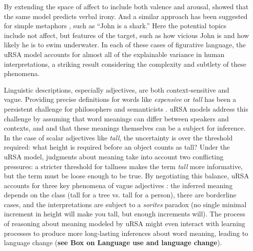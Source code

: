 \documentclass[]{elsarticle}
\begin{document}
By extending
the space of affect to include both valence and arousal, \citet{kao2015} showed that the same model predicts verbal irony. And a similar approach has been suggested for simple
metaphors \citep{kao2014b}, such as ``John is a shark.''
Here the potential topics include not affect, but features of the
target, such as how vicious John is and how likely he is to swim
underwater. In each of these cases of figurative language, the uRSA model accounts for almost all of the explainable variance in
human interpretations, a striking result considering the complexity and subtlety of these phenomena.

Linguistic descriptions, especially adjectives, are both context-sensitive and vague. Providing precise definitions for words like \emph{expensive} or \emph{tall} has been a persistent challenge for philosophers and semanticists \citep{williamson2002}. uRSA models address this challenge by assuming that word meanings can differ between speakers and contexts, and and that these meanings themselves can be a subject for inference. In the case of scalar adjectives like \emph{tall}, the uncertainty is over the threshold required: what height is required before an object counts as tall?
Under the uRSA model, judgments about meaning take into account two conflicting pressures: a stricter threshold for tallness makes the term \emph{tall} more informative, but the term must be loose enough to be true. By negotiating this balance, uRSA accounts for three key phenomena of vague adjectives \citep{lassiter2015}: the inferred meaning depends on the class (tall for a tree vs. tall for a person), there are borderline cases, and the interpretations are subject to a \emph{sorites} paradox (no single minimal increment in height will make you tall, but enough increments will). The process of reasoning about meaning modeled by uRSA might even interact with learning processes to produce more long-lasting inferences about word meaning, leading to language change (\textbf{see Box on Language use and language change}).



\end{document}
